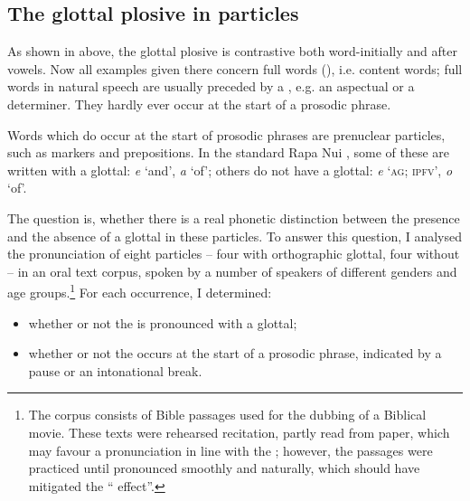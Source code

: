 \subsection{The glottal plosive in particles}\label{sec:2.2.5}
\largerpage
{}
As shown in  above, the glottal plosive is contrastive both word-initially and after vowels. Now all examples given there concern full words (), i.e. content words; full words in natural speech are usually preceded by a , e.g. an aspectual or a determiner. They hardly ever occur at the start of a prosodic phrase. 

Words which do occur at the start of prosodic phrases are prenuclear particles, such as  markers and prepositions. In the standard Rapa Nui , some of these are written with a glottal: \textit{{\ꞌ}e} ‘and’, \textit{{\ꞌ}a} ‘of’; others do not have a glottal: \textit{e} ‘\textsc{ag}; \textsc{ipfv}’, \textit{o} ‘of’. 

The question is, whether there is a real phonetic distinction between the presence and the absence of a glottal in these particles. To answer this question, I analysed the pronunciation of eight particles – four with orthographic glottal, four without – in an oral text corpus, spoken by a number of speakers of different genders and age groups.\footnote{\label{fn:36}The corpus consists of Bible passages used for the dubbing of a Biblical movie. These texts were rehearsed recitation, partly read from paper, which may favour a pronunciation in line with the ; however, the passages were practiced until pronounced smoothly and naturally, which should have mitigated the “ effect”.}  For each occurrence, I determined:

\begin{itemize}
\item 
whether or not the  is pronounced with a glottal;

\item 
whether or not the  occurs at the start of a prosodic phrase, indicated by a pause or an intonational break.

\end{itemize}

